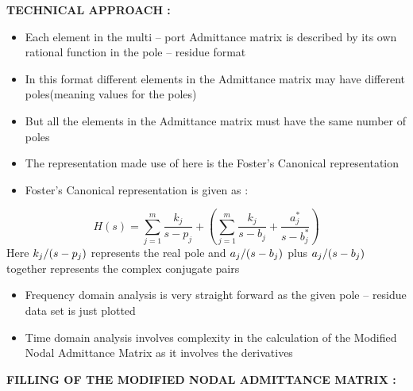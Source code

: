 \documentclass{article}
\begin{document}
\textbf{TECHNICAL APPROACH :}

\begin{itemize}
\item Each element in the multi -- port Admittance matrix is described by its own rational function in the pole -- residue format
\item In this format different elements in the Admittance matrix may have different poles(meaning values for the poles)
\item But all the elements in the Admittance matrix must have the same number of poles
\item The representation made use of here is the Foster's Canonical representation
\item Foster's Canonical representation is given as :
\end{itemize}
\[
H(s)=\sum\limits_{j=1}^m {\frac{k_j }{s-p_j }} +\left( {\sum\limits_{j=1}^m
{\frac{k_j }{s-b_j }+\frac{a_j^\ast }{s-b_j^\ast }} } \right)
\]
Here ${k_j } \mathord{\left/ {\vphantom {{k_j } {\left( {s-p_j } \right)}}}
\right. \kern-\nulldelimiterspace} {\left( {s-p_j } \right)}$ represents the
real pole and ${a_j } \mathord{\left/ {\vphantom {{a_j } {\left( {s-b_j }
\right)}}} \right. \kern-\nulldelimiterspace} {\left( {s-b_j } \right)}$
plus ${a_j } \mathord{\left/ {\vphantom {{a_j } {\left( {s-b_j } \right)}}}
\right. \kern-\nulldelimiterspace} {\left( {s-b_j } \right)}$ together
represents the complex conjugate pairs

\begin{itemize}
\item Frequency domain analysis is very straight forward as the given pole -- residue data set is just plotted
\item Time domain analysis involves complexity in the calculation of the Modified Nodal Admittance Matrix as it involves the derivatives
\end{itemize}

\textbf{FILLING OF THE MODIFIED NODAL ADMITTANCE MATRIX :}
\end{document}
